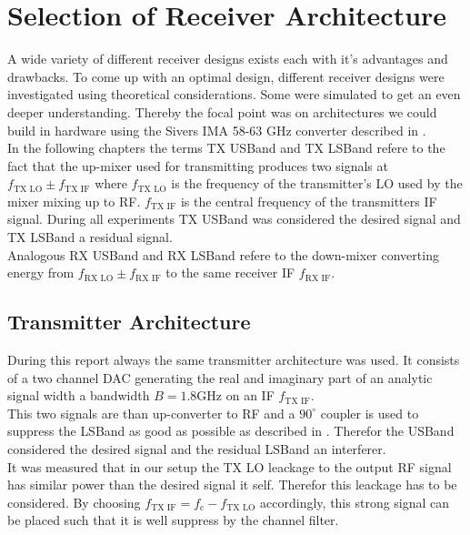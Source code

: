 \chapter{Selection of Receiver Architecture}
\label{chap:rx}

A wide variety of different receiver designs exists each with it's advantages
and drawbacks. To come up with an optimal design, different receiver designs
were investigated using theoretical considerations. Some were simulated to
get an even deeper understanding.
Thereby the focal point was on architectures we could
build in hardware using the Sivers IMA 58-63 GHz converter described in
. \\

In the following chapters the terms \gls{TX} \gls{USBand} and \gls{TX}
\gls{LSBand} refere to the fact that the up-mixer used for transmitting
produces two signals at $f_{\text{TX LO}} \pm f_{\text{TX IF}}$ where
$f_{\text{TX LO}}$ is the frequency of the transmitter's \gls{LO}
used by the mixer mixing up to \gls{RF}. $f_{\text{TX IF}}$ is the central
frequency of the transmitters \gls{IF} signal. During all experiments
\gls{TX} \gls{USBand} was considered the desired signal and \gls{TX}
\gls{LSBand} a residual signal. \\

Analogous \gls{RX} \gls{USBand} and \gls{RX} \gls{LSBand} refere to
the down-mixer converting energy from $f_{\text{RX LO}} \pm f_{\text{RX IF}}$
to the same receiver \gls{IF} $f_{\text{RX IF}}$. \\

\section{Transmitter Architecture}
During this report always the same transmitter architecture was used.
It consists of a two channel \gls{DAC} generating the real and imaginary
part of an analytic signal width a bandwidth $B = 1.8 \text{GHz}$
on an \gls{IF} $f_{\text{TX IF}}$. \\

This two signals are than up-converter to
\gls{RF} and a $90^\circ$ coupler is used to suppress the \gls{LSBand}
as good as possible as described in .
Therefor the \gls{USBand} considered the desired signal and the
residual \gls{LSBand} an interferer. \\

It was measured that in our setup the \gls{TX} \gls{LO} leackage
to the output \gls{RF} signal has similar power than the desired
signal it self. Therefor this leackage has to be considered.
By choosing $f_{\text{TX IF}} = f_{\text{c}} - f_{\text{TX LO}}$ accordingly,
this strong signal can be placed such that it is well suppress by the channel
filter. \\

